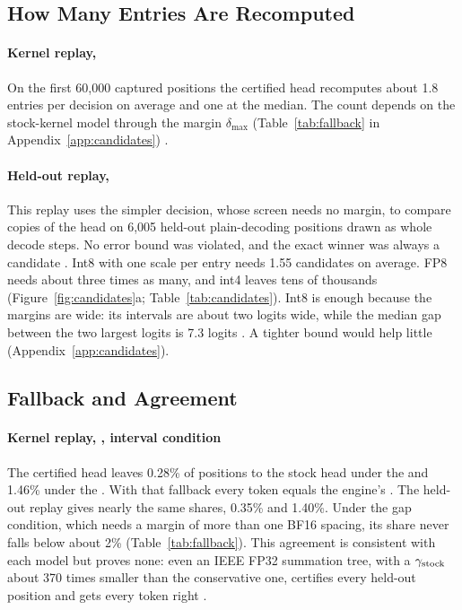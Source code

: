 \subsection{How Many Entries Are Recomputed}\label{sec:geometry-selfevidence}\label{sec:candidates}
\paragraph{Kernel replay, \Rstock{}} On the first 60,000 captured positions the certified head recomputes about 1.8 entries per decision on average and one at the median. The count depends on the stock-kernel model through the margin $\delta_{\max}$ (Table~\ref{tab:fallback} in Appendix~\ref{app:candidates}) .

\paragraph{Held-out replay, \Rreal{}} This replay uses the simpler \Rreal{} decision, whose screen needs no margin, to compare copies of the head on 6,005 held-out plain-decoding positions drawn as whole decode steps. No error bound was violated, and the exact winner was always a candidate . Int8 with one scale per entry needs 1.55 candidates on average. FP8 needs about three times as many, and int4 leaves tens of thousands (Figure~\ref{fig:candidates}a; Table~\ref{tab:candidates}). Int8 is enough because the margins are wide: its intervals are about two logits wide, while the median gap between the two largest logits is 7.3 logits . A tighter bound would help little (Appendix~\ref{app:candidates}).

\subsection{Fallback and Agreement}\label{sec:rstock-share}
\paragraph{Kernel replay, \Rstock{}, interval condition} The certified head leaves 0.28\% of positions to the stock head under the \modelhopper{} and 1.46\% under the \modelcons. With that fallback every token equals the engine's . The held-out replay gives nearly the same shares, 0.35\% and 1.40\%. Under the gap condition, which needs a margin of more than one BF16 spacing, its share never falls below about 2\% (Table~\ref{tab:fallback}). This agreement is consistent with each model but proves none: even an IEEE FP32 summation tree, with a $\gamma_{\rm stock}$ about 370 times smaller than the conservative one, certifies every held-out position and gets every token right .

